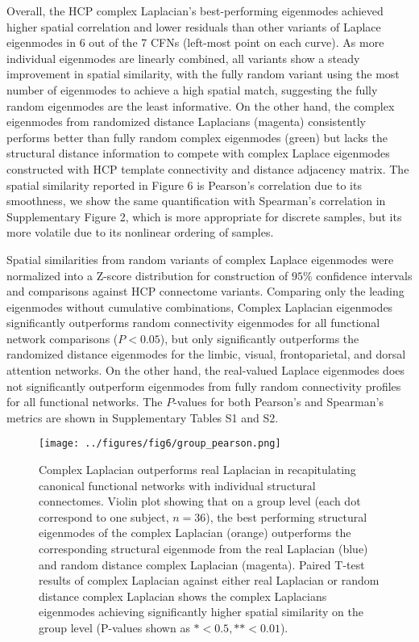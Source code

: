 \documentclass{article}
\begin{document}
Overall, the HCP complex Laplacian's best-performing eigenmodes achieved higher spatial correlation and lower residuals than other variants of Laplace eigenmodes in 6 out of the 7 CFNs (left-most point on each curve). As more individual eigenmodes are linearly combined, all variants show a steady improvement in spatial similarity, with the fully random variant using the most number of eigenmodes to achieve a high spatial match, suggesting the fully random eigenmodes are the least informative. On the other hand, the complex eigenmodes from randomized distance Laplacians (magenta) consistently performs better than fully random complex eigenmodes (green) but lacks the structural distance information to compete with complex Laplace eigenmodes constructed with HCP template connectivity and distance adjacency matrix. The spatial similarity reported in Figure 6 is Pearson's correlation due to its smoothness, we show the same quantification with Spearman's correlation in Supplementary Figure 2, which is more appropriate for discrete samples, but its more volatile due to its nonlinear ordering of samples. 

Spatial similarities from random variants of complex Laplace eigenmodes were normalized into a Z-score distribution for construction of $95\%$ confidence intervals and comparisons against HCP connectome variants. Comparing only the leading eigenmodes without cumulative combinations, Complex Laplacian eigenmodes significantly outperforms random connectivity eigenmodes for all functional network comparisons ($P<0.05$), but only significantly outperforms the randomized distance eigenmodes for the limbic, visual, frontoparietal, and dorsal attention networks. On the other hand, the real-valued Laplace eigenmodes does not significantly outperform eigenmodes from fully random connectivity profiles for all functional networks. The $P$-values for both Pearson's and Spearman's metrics are shown in Supplementary Tables S1 and S2.

\begin{figure}[ht]
\centering
\texttt{[image: ../figures/fig6/group\_pearson.png]}
\caption{Complex Laplacian outperforms real Laplacian in recapitulating canonical functional networks with individual structural connectomes. Violin plot showing that on a group level (each dot correspond to one subject, $n = 36$), the best performing structural eigenmodes of the complex Laplacian (orange) outperforms the corresponding structural eigenmode from the real Laplacian (blue) and random distance complex Laplacian (magenta). Paired T-test results of complex Laplacian against either real Laplacian or random distance complex Laplacian shows the complex Laplacians eigenmodes achieving significantly higher spatial similarity on the group level (P-values shown as $* < 0.5, ** < 0.01$).}
\label{fig:fig7}
\end{figure}
\end{document}
